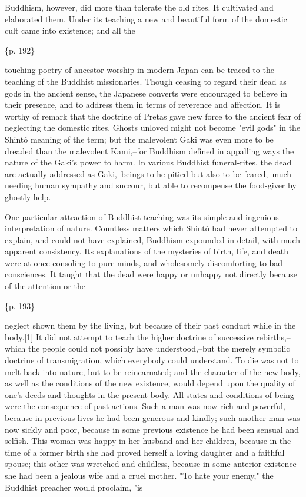 Buddhism, however, did more than tolerate the old rites. It cultivated and elaborated them. Under its teaching a new and beautiful form of the domestic cult came into existence; and all the

\{p. 192\}

touching poetry of ancestor-worship in modern Japan can be traced to the teaching of the Buddhist missionaries. Though ceasing to regard their dead as gods in the ancient sense, the Japanese converts were encouraged to believe in their presence, and to address them in terms of reverence and affection. It is worthy of remark that the doctrine of Pretas gave new force to the ancient fear of neglecting the domestic rites. Ghosts unloved might not become "evil gods" in the Shintô meaning of the term; but the malevolent Gaki was even more to be dreaded than the malevolent Kami,--for Buddhism defined in appalling ways the nature of the Gaki's power to harm. In various Buddhist funeral-rites, the dead are actually addressed as Gaki,--beings to he pitied but also to be feared,--much needing human sympathy and succour, but able to recompense the food-giver by ghostly help.

One particular attraction of Buddhist teaching was its simple and ingenious interpretation of nature. Countless matters which Shintô had never attempted to explain, and could not have explained, Buddhism expounded in detail, with much apparent consistency. Its explanations of the mysteries of birth, life, and death were at once consoling to pure minds, and wholesomely discomforting to bad consciences. It taught that the dead were happy or unhappy not directly because of the attention or the

\{p. 193\}

neglect shown them by the living, but because of their past conduct while in the body.[1] It did not attempt to teach the higher doctrine of successive rebirths,--which the people could not possibly have understood,--but the merely symbolic doctrine of transmigration, which everybody could understand. To die was not to melt back into nature, but to be reincarnated; and the character of the new body, as well as the conditions of the new existence, would depend upon the quality of one's deeds and thoughts in the present body. All states and conditions of being were the consequence of past actions. Such a man was now rich and powerful, because in previous lives he had been generous and kindly; such another man was now sickly and poor, because in some previous existence he had been sensual and selfish. This woman was happy in her husband and her children, because in the time of a former birth she had proved herself a loving daughter and a faithful spouse; this other was wretched and childless, because in some anterior existence she had been a jealous wife and a cruel mother. "To hate your enemy," the Buddhist preacher would proclaim, "is

